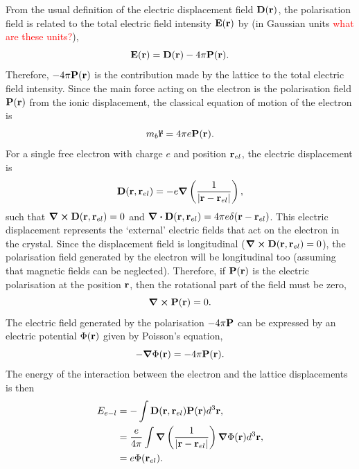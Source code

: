 From the usual definition of the electric displacement field $\vb{D}(\vb{r})$, the polarisation field is related to the total electric field intensity $\vb{E}(\vb{r})$ by (in Gaussian units \textcolor{red}{what are these units?}),
\begin{equation}
    \vb{E}(\vb{r}) = \vb{D}(\vb{r}) - 4\pi\vb{P}(\vb{r}).
\label{eqn-2121-1}
\end{equation}
Therefore, $-4\pi\vb{P}(\vb{r})$ is the contribution made by the lattice to the total electric field intensity. Since the main force acting on the electron is the polarisation field $\vb{P}(\vb{r})$ from the ionic displacement, the classical equation of motion of the electron is
\begin{equation}
    m_b \vb{\ddot{r}} = 4\pi e \vb{P}(\vb{r}).
\label{eqn-2121-2}
\end{equation}
For a single free electron with charge $e$ and position $\vb{r}_{el}$, the electric displacement is
\begin{equation}
    \vb{D}(\vb{r}, \vb{r}_{el}) = -e \grad \left(\frac{1}{\abs{\vb{r} - \vb{r}_{el}}}\right),
\label{eqn-2121-3}
\end{equation}
such that $\curl \vb{D}(\vb{r}, \vb{r}_{el}) = 0$ and $\div \vb{D}(\vb{r}, \vb{r}_{el}) = 4\pi e \delta (\vb{r} - \vb{r}_{el})$. This electric displacement represents the `external' electric fields that act on the electron in the crystal. Since the displacement field is longitudinal ($\curl \vb{D}(\vb{r}, \vb{r}_{el}) = 0$), the polarisation field generated by the electron will be longitudinal too (assuming that magnetic fields can be neglected). Therefore, if $\vb{P}(\vb{r})$ is the electric polarisation at the position $\vb{r}$, then the rotational part of the field must be zero,
\begin{equation}
    \curl \vb{P}(\vb{r}) = 0.
\label{eqn-2121-4}
\end{equation}
The electric field generated by the polarisation $-4\pi \vb{P}$ can be expressed by an electric potential $\Phi(\vb{r})$ given by Poisson's equation,
\begin{equation}
    -\grad \Phi(\vb{r}) = -4\pi\vb{P}(\vb{r}).
\label{eqn-2121-5}
\end{equation}
The energy of the interaction between the electron and the lattice displacements is then
\begin{equation}
    \begin{aligned}
    E_{e-l} &= -\int \vb{D}(\vb{r}, \vb{r}_{el}) \vb{P}(\vb{r}) d^3 \vb{r}, \\ 
    &= \frac{e}{4\pi} \int \grad \left( \frac{1}{\abs{\vb{r} - \vb{r}_{el}}} \right) \grad \Phi(\vb{r}) d^3 \vb{r}, \\
    &= e\Phi(\vb{r}_{el}).
    \end{aligned}
\label{eqn-2121-6}
\end{equation}
